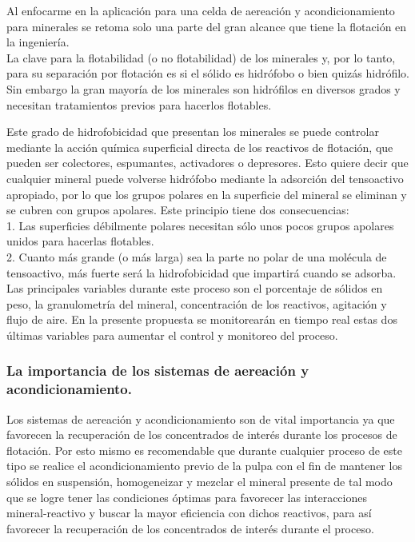 \documentclass[11pt,letter
								]
								{article}
\begin{document}
Al enfocarme   en  la aplicación para una celda de  aereación  y acondicionamiento para minerales se retoma solo una parte del gran alcance que tiene la flotación en la ingeniería. \\ 


La clave para la flotabilidad (o no flotabilidad) de los minerales y, por lo tanto, para su separación por flotación es si el sólido es hidrófobo o bien  quizás hidrófilo. Sin embargo la  gran mayoría de los minerales son hidrófilos en diversos grados y necesitan tratamientos previos  para hacerlos flotables. 

Este  grado de hidrofobicidad  que presentan los  minerales se puede controlar mediante la acción química superficial directa de los reactivos de flotación, que pueden ser colectores, espumantes, activadores o depresores. Esto quiere decir que cualquier mineral puede volverse hidrófobo mediante la adsorción del tensoactivo apropiado, por lo que los grupos polares en la superficie del mineral se eliminan y se cubren con grupos apolares. Este principio tiene dos consecuencias:\cite{1}\\

1. Las superficies débilmente polares necesitan sólo unos pocos grupos apolares unidos para hacerlas flotables.\cite{1}\\

2. Cuanto más grande (o más larga) sea la parte no polar de una molécula de tensoactivo, más fuerte será la hidrofobicidad que impartirá cuando se adsorba.\cite{1}\\

Las principales variables durante este proceso son el porcentaje de sólidos en peso, la granulometría del mineral, concentración de los reactivos,  agitación y flujo de aire. En la presente propuesta  se monitorearán  en tiempo real  estas dos últimas variables  para aumentar  el control y monitoreo del proceso.  \\



\subsubsection{La importancia de los sistemas de aereación y acondicionamiento. }

Los sistemas de aereación y acondicionamiento  son de vital importancia ya que favorecen la recuperación de los concentrados de interés durante los procesos de flotación. Por esto mismo es recomendable que durante  cualquier proceso de este tipo se realice   el acondicionamiento previo  de la pulpa con el fin de mantener los sólidos en suspensión, homogeneizar y mezclar el mineral presente de tal modo que se logre  tener  las condiciones óptimas para favorecer las 
interacciones mineral-reactivo y
 buscar la mayor eficiencia  con dichos reactivos, para  así favorecer  la recuperación de los concentrados de interés durante el proceso. \\
\end{document}
